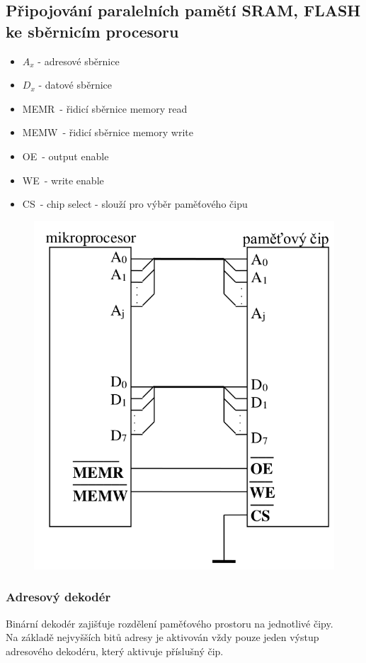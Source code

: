 \subsection{Připojování paralelních pamětí SRAM, FLASH ke sběrnicím procesoru}
\begin{itemize}
    \item $A_x$ - adresové sběrnice
    \item $D_x$ - datové sběrnice
    \item MEMR\ - řidicí sběrnice memory read
    \item MEMW\ - řidicí sběrnice memory write
    \item OE\ - output enable
    \item WE\ - write enable
    \item CS\ - chip select - slouží pro výběr paměťového čipu
\end{itemize}
\newpage
\begin{figure}[h!]
    \centering
    \includegraphics[scale = 0.3]{img/MemConnect.png}
\end{figure}

\subsubsection*{Adresový dekodér}
Binární dekodér zajišťuje rozdělení
paměťového prostoru na jednotlivé čipy.\\
Na základě nejvyšších bitů adresy je aktivován vždy pouze jeden výstup adresového dekodéru, který aktivuje příslušný čip.\\

